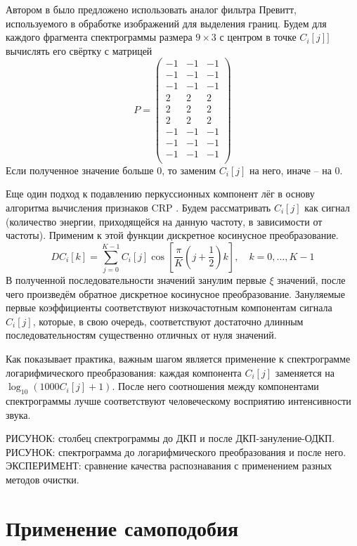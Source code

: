 Автором в \cite{Glazyrin2012} было предложено использовать аналог фильтра
Превитт, используемого в обработке изображений для выделения границ. Будем
для каждого фрагмента спектрограммы размера $9 \times 3$ с центром в точке
$C_i[j]]$ вычислять его свёртку с матрицей
$$P = \begin{pmatrix}
-1 & -1 & -1\\
-1 & -1 & -1\\
-1 & -1 & -1\\
2 & 2 & 2\\
2 & 2 & 2\\
2 & 2 & 2\\
-1 & -1 & -1\\
-1 & -1 & -1\\
-1 & -1 & -1\\
\end{pmatrix}$$
Если полученное значение больше 0, то заменим $C_i[j]$ на него, иначе -- на 0.

Еще один подход к подавлению перкуссионных компонент лёг в основу алгоритма
вычисления признаков CRP \cite{Mueller2009}. Будем рассматривать $C_i[j]$ как
сигнал (количество энергии, приходящейся на данную частоту, в зависимости от
частоты). Применим к этой функции дискретное косинусное преобразование.
$$ DC_i[k] = \sum\limits_{j=0}^{K-1} C_i[j] \cos\left[ \frac{\pi}{K} \left(
j+\frac{1}{2} \right) k \right], \quad k=0, \ldots, K-1 $$
В полученной последовательности значений занулим первые $\xi$ значений, после
чего произведём обратное дискретное косинусное преобразование. Зануляемые первые
коэффициенты соответствуют низкочастотным компонентам сигнала $C_i[j]$, которые,
в свою очередь, соответствуют достаточно длинным последовательностям существенно
отличных от нуля значений.

Как показывает практика, важным шагом является применение к спектрограмме
логарифмического преобразования: каждая компонента $C_i[j]$ заменяется на
$\log_{10}(1000 C_i[j] + 1)$. После него соотношения между компонентами
спектрограммы лучше соответствуют человеческому восприятию интенсивности звука.

РИСУНОК: столбец спектрограммы до ДКП и после ДКП-зануление-ОДКП.
РИСУНОК: спектрограмма до логарифмического преобразования и после него.
ЭКСПЕРИМЕНТ: сравнение качества распознавания с применением разных методов
очистки.

\section{Применение самоподобия} \label{sect1_selfsim}

